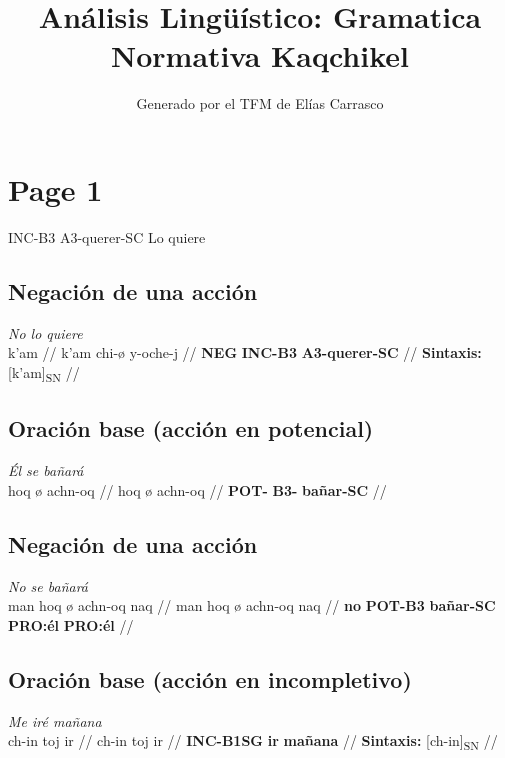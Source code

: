 \documentclass{article}%
\title{Análisis Lingüístico: Gramatica Normativa Kaqchikel}%
\author{Generado por el TFM de Elías Carrasco}%
\begin{document}
%
\normalsize%
\maketitle%
\section{Page 1}%
\label{sec:Page1}%
INC{-}B3 %
A3{-}querer{-}SC %
Lo quiere %
\subsection{Negación de una acción}%
\label{subsec:Negacindeunaaccin}%

%
\par\medskip%
\ex
\textit{No lo quiere} \\
\begingl
\gla k'am //
\glb k'am chi-ø y-oche-j //
\glc \textbf{NEG} \textbf{INC-}\textbf{B3} \textbf{A3-}\textbf{querer-}\textbf{SC} //
\glft \textbf{Sintaxis:} [k'am]\textsubscript{SN} //
\endgl
\xe
%
\medskip%
\subsection{Oración base (acción en potencial)}%
\label{subsec:Oracinbase(accinenpotencial)}%

%
\par\medskip%
\ex
\textit{Él se bañará} \\
\begingl
\gla hoq ø achn-oq //
\glb hoq ø achn-oq //
\glc \textbf{POT-} \textbf{B3-} \textbf{bañar-}\textbf{SC} //
\endgl
\xe
%
\medskip%
\subsection{Negación de una acción}%
\label{subsec:Negacindeunaaccin}%

%
\par\medskip%
\ex
\textit{No se bañará} \\
\begingl
\gla man hoq ø achn-oq naq //
\glb man hoq ø achn-oq naq //
\glc \textbf{no} \textbf{POT-B3} \textbf{bañar-SC} \textbf{PRO:él} \textbf{PRO:él} //
\endgl
\xe
%
\medskip%
\subsection{Oración base (acción en incompletivo)}%
\label{subsec:Oracinbase(accinenincompletivo)}%

%
\par\medskip%
\ex
\textit{Me iré mañana} \\
\begingl
\gla ch-in toj ir //
\glb ch-in toj ir //
\glc \textbf{INC-}\textbf{B1SG} \textbf{ir} \textbf{mañana} //
\glft \textbf{Sintaxis:} [ch-in]\textsubscript{SN} //
\endgl
\xe
%
\medskip%
\end{document}

